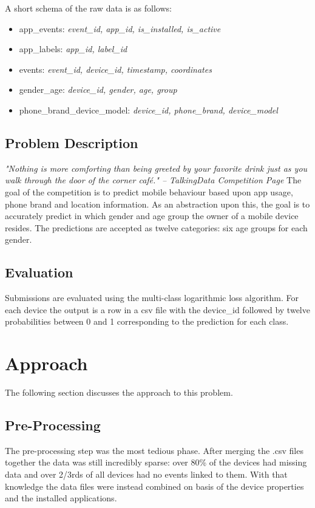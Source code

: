 \documentclass[runningheads,a4paper]{llncs}
\begin{document}
A short schema of the raw data is as follows:
\begin{itemize}
\item app\_events: \textit{event\_id, app\_id, is\_installed, is\_active}
\item app\_labels: \textit{app\_id, label\_id}
\item events: \textit{event\_id, device\_id, timestamp, coordinates}
\item gender\_age: \textit{device\_id, gender, age, group}
\item phone\_brand\_device\_model: \textit{device\_id, phone\_brand, device\_model}
\end{itemize}

\subsection{Problem Description}
\textit{"Nothing is more comforting than being greeted by your favorite drink just as you walk through the door of the corner café." -- TalkingData Competition Page } 
\smallskip
\newline
\noindent
The goal of the competition is to predict mobile behaviour based upon app usage, phone brand and location information. As an abstraction upon this, the goal is to accurately predict in which gender and age group the owner of a mobile device resides. The predictions are accepted as twelve categories: six age groups for each gender. 
\subsection{Evaluation}
Submissions are evaluated using the multi-class logarithmic loss algorithm. For each device the output is a row in a csv file with the device\_id followed by twelve probabilities between 0 and 1 corresponding to the prediction for each class.
\section{Approach}
The following section discusses the approach to this problem. 
\subsection{Pre-Processing}
The pre-processing step was the most tedious phase. After merging the .csv files together the data was still incredibly sparse: over 80\% of the devices had missing data and over 2/3rds of all devices had no events linked to them. With that knowledge the data files were instead combined on basis of the device properties and the installed applications. 
\end{document}
